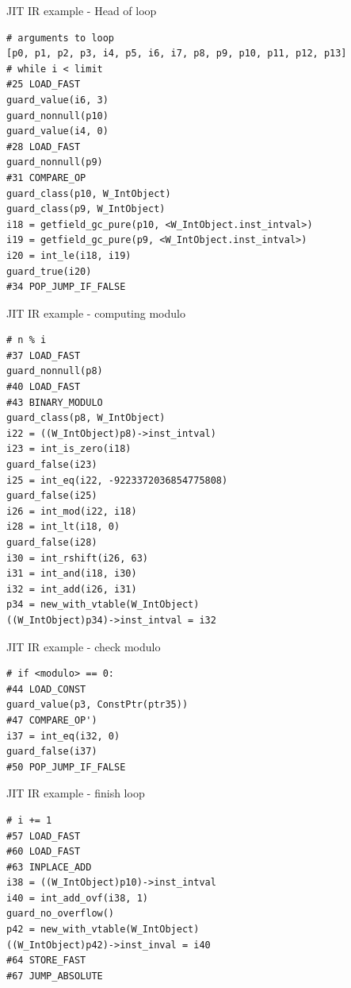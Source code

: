 \documentclass[14pt]{beamer}
\begin{document}
\begin{frame}[fragile]{JIT IR example - Head of loop}
\footnotesize{
\begin{verbatim}
# arguments to loop
[p0, p1, p2, p3, i4, p5, i6, i7, p8, p9, p10, p11, p12, p13]
# while i < limit
#25 LOAD_FAST
guard_value(i6, 3)
guard_nonnull(p10)
guard_value(i4, 0)
#28 LOAD_FAST
guard_nonnull(p9)
#31 COMPARE_OP
guard_class(p10, W_IntObject)
guard_class(p9, W_IntObject)
i18 = getfield_gc_pure(p10, <W_IntObject.inst_intval>)
i19 = getfield_gc_pure(p9, <W_IntObject.inst_intval>)
i20 = int_le(i18, i19)
guard_true(i20)
#34 POP_JUMP_IF_FALSE
\end{verbatim}
}
\end{frame}

\begin{frame}[fragile]{JIT IR example - computing modulo}
\footnotesize{
\begin{verbatim}
# n % i
#37 LOAD_FAST
guard_nonnull(p8)
#40 LOAD_FAST
#43 BINARY_MODULO
guard_class(p8, W_IntObject)
i22 = ((W_IntObject)p8)->inst_intval)
i23 = int_is_zero(i18)
guard_false(i23)
i25 = int_eq(i22, -9223372036854775808)
guard_false(i25)
i26 = int_mod(i22, i18)
i28 = int_lt(i18, 0)
guard_false(i28)
i30 = int_rshift(i26, 63)
i31 = int_and(i18, i30)
i32 = int_add(i26, i31)
p34 = new_with_vtable(W_IntObject)
((W_IntObject)p34)->inst_intval = i32
\end{verbatim}
}
\end{frame}

\begin{frame}[fragile]{JIT IR example - check modulo}
\footnotesize{
\begin{verbatim}
# if <modulo> == 0:
#44 LOAD_CONST
guard_value(p3, ConstPtr(ptr35))
#47 COMPARE_OP')
i37 = int_eq(i32, 0)
guard_false(i37)
#50 POP_JUMP_IF_FALSE
\end{verbatim}
}
\end{frame}

\begin{frame}[fragile]{JIT IR example - finish loop}
\footnotesize{
\begin{verbatim}
# i += 1
#57 LOAD_FAST
#60 LOAD_FAST
#63 INPLACE_ADD
i38 = ((W_IntObject)p10)->inst_intval
i40 = int_add_ovf(i38, 1)
guard_no_overflow()
p42 = new_with_vtable(W_IntObject)
((W_IntObject)p42)->inst_inval = i40
#64 STORE_FAST
#67 JUMP_ABSOLUTE
\end{verbatim}
}
\end{frame}
\end{document}
